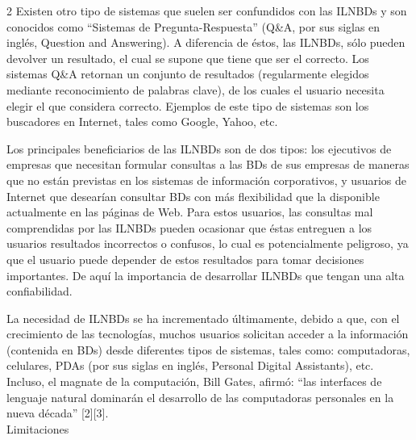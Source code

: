 \documentclass[letterpaper,10pt,final,hyphenatedtitles]{papertexKS}
\begin{document}
\begin{news}{2}
Existen otro tipo de sistemas que suelen ser confundidos con las ILNBDs y son  conocidos como “Sistemas de Pregunta-Respuesta” (Q\&A, por sus siglas en inglés, Question and Answering). A diferencia de éstos, las ILNBDs, sólo pueden devolver un resultado, el cual se supone que tiene que ser el correcto. Los sistemas Q\&A retornan un conjunto de resultados (regularmente elegidos mediante reconocimiento de palabras clave), de los cuales el usuario necesita elegir el que considera correcto. Ejemplos de este tipo de sistemas son los buscadores en Internet, tales como Google, Yahoo, etc.

\begin{center}
\end{center} 

Los principales beneficiarios de las ILNBDs son de dos tipos: los ejecutivos de empresas que necesitan formular consultas a las BDs de sus empresas de maneras que no están previstas en los sistemas de información corporativos, y usuarios de Internet que desearían consultar BDs con más flexibilidad que la disponible actualmente en las páginas de Web. Para estos usuarios, las consultas mal comprendidas por las ILNBDs pueden ocasionar que éstas entreguen a los usuarios resultados incorrectos o confusos, lo cual es potencialmente peligroso, ya que el usuario puede depender de estos resultados para tomar decisiones importantes. De aquí la importancia de desarrollar ILNBDs que tengan una alta confiabilidad.

La necesidad de ILNBDs se ha incrementado últimamente, debido a que, con el crecimiento de las tecnologías, muchos usuarios solicitan acceder a la información (contenida en BDs) desde diferentes tipos de sistemas, tales como: computadoras, celulares, PDAs (por sus siglas en inglés, Personal Digital Assistants), etc. Incluso, el magnate de la computación, Bill Gates, afirmó: “las interfaces de lenguaje natural dominarán el desarrollo de las computadoras personales en la nueva década” [2][3].
\\

\noindent\textcolor{color}{\Large{Limitaciones}}


\end{news}
\end{document}
